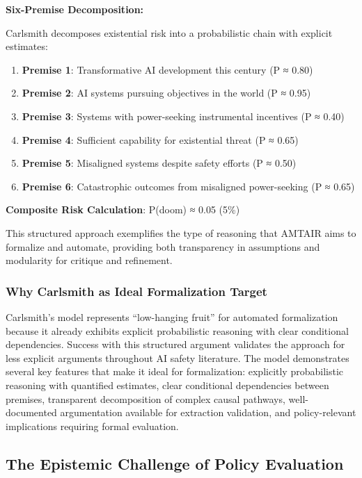 \documentclass[
  11pt,
  letterpaper,
]{book}
\providecommand{\tightlist}{%
  \setlength{\itemsep}{0pt}\setlength{\parskip}{0pt}}
\begin{document}
\textbf{Six-Premise Decomposition:}

Carlsmith decomposes existential risk into a probabilistic chain with
explicit estimates:

\begin{enumerate}
\def\labelenumi{\arabic{enumi}.}
\tightlist
\item
  \textbf{Premise 1}: Transformative AI development this century (P ≈
  0.80)
\item
  \textbf{Premise 2}: AI systems pursuing objectives in the world (P ≈
  0.95)
\item
  \textbf{Premise 3}: Systems with power-seeking instrumental incentives
  (P ≈ 0.40)
\item
  \textbf{Premise 4}: Sufficient capability for existential threat (P ≈
  0.65)
\item
  \textbf{Premise 5}: Misaligned systems despite safety efforts (P ≈
  0.50)
\item
  \textbf{Premise 6}: Catastrophic outcomes from misaligned
  power-seeking (P ≈ 0.65)
\end{enumerate}

\textbf{Composite Risk Calculation}: P(doom) ≈ 0.05 (5\%)

This structured approach exemplifies the type of reasoning that AMTAIR
aims to formalize and automate, providing both transparency in
assumptions and modularity for critique and refinement.

\subsubsection{Why Carlsmith as Ideal Formalization
Target}\label{sec-carlsmith-ideal}

Carlsmith's model represents ``low-hanging fruit'' for automated
formalization because it already exhibits explicit probabilistic
reasoning with clear conditional dependencies. Success with this
structured argument validates the approach for less explicit arguments
throughout AI safety literature. The model demonstrates several key
features that make it ideal for formalization: explicitly probabilistic
reasoning with quantified estimates, clear conditional dependencies
between premises, transparent decomposition of complex causal pathways,
well-documented argumentation available for extraction validation, and
policy-relevant implications requiring formal evaluation.

\subsection{The Epistemic Challenge of Policy
Evaluation}\label{sec-epistemic-challenge}
\end{document}
